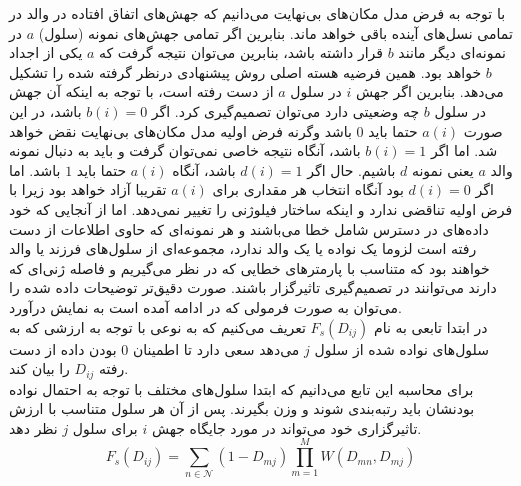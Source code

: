 با توجه به فرض مدل مکان‌های بی‌نهایت می‌دانیم که جهش‌های اتفاق افتاده در والد در تمامی نسل‌های آینده باقی خواهد ماند. بنابرین اگر تمامی جهش‌های نمونه (سلول) $a$ در نمونه‌ای دیگر مانند $b$ قرار داشته باشد، بنابرین می‌توان نتیجه گرفت که $a$ یکی از اجداد $b$ خواهد بود. همین فرضیه هسته اصلی روش پیشنهادی درنظر گرفته شده را تشکیل می‌دهد. بنابرین اگر جهش $i$ در سلول $a$ از دست رفته است، با توجه به اینکه آن جهش در سلول $b$ چه وضعیتی دارد می‌توان تصمیم‌گیری کرد. اگر $b(i)=0$ باشد، در این صورت $a(i)$ حتما باید $0$ باشد وگرنه فرض اولیه مدل مکان‌های بی‌نهایت نقض خواهد شد. اما اگر $b(i)=1$ باشد، آنگاه نتیجه خاصی نمی‌توان گرفت و باید به دنبال نمونه والد $a$ یعنی نمونه $d$ باشیم. حال اگر $d(i)=1$ باشد، آنگاه $a(i)$ حتما باید $1$ باشد. اما اگر $d(i)=0$ بود آنگاه انتخاب هر مقداری برای $a(i)$ تقریبا آزاد خواهد بود زیرا با فرض اولیه تناقضی ندارد و اینکه ساختار فیلوژنی را تغییر نمی‌دهد. اما از آنجایی که  خود داده‌های در دسترس شامل خطا می‌باشند و هر نمونه‌ای که حاوی اطلاعات از دست رفته است لزوما یک نواده یا یک والد ندارد، مجموعه‌ای از سلول‌های فرزند یا والد خواهند بود که متناسب با پارمترهای خطایی که در نظر می‌گیریم و فاصله ژنی‌ای که دارند می‌توانند در تصمیم‌گیری تاثیرگزار باشند. صورت دقیق‌تر توضیحات داده شده را می‌توان به صورت فرمولی که در ادامه آمده است به نمایش درآورد.
\\
در ابتدا تابعی به نام $F_s(D_{ij})$ تعریف می‌کنیم که به نوعی با توجه به ارزشی که به سلول‌های نواده شده از سلول $j$ می‌دهد سعی دارد تا اطمینان $0$ بودن داده از دست رفته $D_{ij}$ را بیان کند.
\\
برای محاسبه این تابع می‌دانیم که ابتدا سلول‌های مختلف با توجه به احتمال نواده بودنشان باید رتبه‌بندی شوند و وزن بگیرند. پس از آن  هر سلول متناسب با ارزش تاثیرگزاری خود می‌تواند در مورد جایگاه جهش $i$ برای سلول $j$ نظر دهد.
\begin{equation}
	F_s(D_{ij}) = \sum_{n \in \mathcal{N}}  (1-D_{mj})  \prod_{m=1}^{M} W(D_{mn}, D_{mj})
	\label{eq:F_s_simple}
\end{equation}

